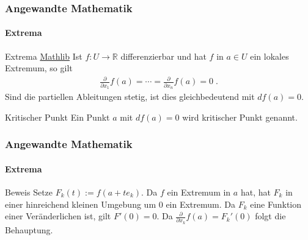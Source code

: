 \documentclass{beamer}
\begin{document}
\begin{frame}
    \frametitle{Angewandte Mathematik}
\framesubtitle{Extrema}
    \begin{block}{Extrema \href{https://github.com/leanprover-community/mathlib4/blob/f4f0b47a2f859d27e965c812344deb1435fe8d48/Mathlib/Analysis/Calculus/LocalExtr/Basic.lean\#L184-L190}{Mathlib}}
 Ist $f: U  \to \mathbb{R}$ differenzierbar und hat  $f$ in $a \in U$ ein lokales Extremum, so gilt 
\begin{align*}
\frac{\partial}{\partial x_{1}} f(a) = \cdots  = \frac{\partial}{\partial x_{n}} f(a) = 0 \;.
\end{align*}
Sind die partiellen Ableitungen stetig, ist dies  gleichbedeutend mit $df(a) = 0$.
\end{block}
    \begin{block}{Kritischer Punkt}
 Ein Punkt $a$ mit $df(a) = 0$ wird kritischer Punkt genannt.
\end{block}

 \end{frame}

\begin{frame}
    \frametitle{Angewandte Mathematik}
\framesubtitle{Extrema}
    \begin{block}{Beweis}
Setze $F_k(t) := f(a + t e_k)$. Da $f$ ein Extremum in $a$ hat, hat $F_k$ in einer hinreichend kleinen Umgebung um $0$ ein Extremum. 
Da $F_k$ eine Funktion einer Veränderlichen ist, gilt $F'(0) = 0$. Da $\frac{\partial}{\partial x_k} f(a) = F_k'(0)$ folgt die Behauptung.
\end{block}
 \end{frame}
\end{document}
